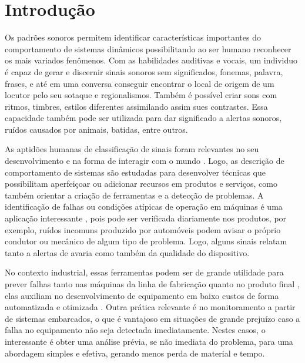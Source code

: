\chapter{Introdução} \label{cha:introduction}

    Os padrões sonoros permitem identificar características importantes do comportamento de sistemas dinâmicos possibilitando ao ser humano reconhecer os mais variados fenômenos. Com as habilidades auditivas e vocais, um individuo é capaz de gerar e discernir sinais sonoros sem significados, fonemas, palavra, frases, e até em uma conversa conseguir encontrar o local de origem de um locutor pelo seu sotaque e regionalismos. Também é possível criar sons com ritmos, timbres, estilos diferentes assimilando assim sues contrastes. Essa capacidade também pode ser utilizada para dar significado a alertas sonoros, ruídos causados por animais, batidas, entre outros. 
    
    As aptidões humanas de classificação de sinais foram relevantes no seu desenvolvimento e na forma de interagir com o mundo  \cite{jung2020human}. Logo, as descrição de comportamento de sistemas são estudadas para desenvolver técnicas que possibilitam aperfeiçoar ou adicionar recursos em produtos e serviços, como também orientar a criação de ferramentas e a detecção de problemas. A identificação de falhas ou condições atípicas de operação em máquinas é uma aplicação interessante \cite{yang2019machine}, pois pode ser verificada diariamente nos produtos, por exemplo, ruídos incomuns produzido por automóveis podem avisar o próprio condutor ou mecânico de algum tipo de problema. Logo, alguns sinais relatam tanto a alertas de avaria como também da qualidade do dispositivo.

    No contexto industrial, essas ferramentas podem ser de grande utilidade para prever falhas tanto nas máquinas da linha de fabricação \cite{purohit2019mimii} quanto no produto final \cite{yang2019machine}, elas auxiliam no desenvolvimento de equipamento em baixo custos de forma automatizada e otimizada \cite{zahid2015optimized}. Outra prática relevante é no monitoramento a partir de sistemas embarcados, o que é vantajoso em situações de grande prejuízo caso a falha no equipamento não seja detectada imediatamente. Nestes casos, o interessante é obter uma análise prévia, se não imediata do problema, para uma abordagem simples e efetiva, gerando menos perda de material e tempo.

